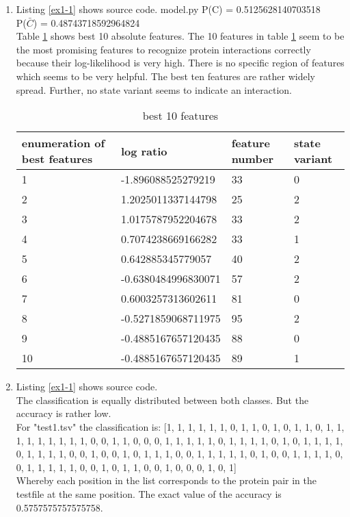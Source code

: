 \documentclass[10pt,a4paper]{article}
\begin{document}
\begin{enumerate}
\item Listing \ref{ex1-1} shows source code.
 {model.py}
P(C) = 0.5125628140703518\\
P($\bar{C}$) = 0.48743718592964824\\
Table \ref{tab1} shows best 10 absolute features.
The 10 features in table \ref{tab1} seem to be the most promising features to recognize protein interactions correctly because their log-likelihood is very high. There is no specific region of features which seems to be very helpful. The best ten features are rather widely spread. Further, no state variant seems to indicate an interaction.
\begin{table}[b]
\label{tab1}
\begin{tabular}{llll}
enumeration of best features & log ratio & feature number & state variant\\
\hline
1 & -1.896088525279219 & 33 & 0\\
2 & 1.2025011337144798 & 25 & 2\\
3 & 1.0175787952204678 & 33 & 2\\
4 & 0.7074238669166282 & 33 & 1\\
5 & 0.642885345779057 & 40 & 2\\
6 & -0.6380484996830071 & 57 & 2\\
7 & 0.6003257313602611 & 81 & 0\\
8 & -0.5271859068711975 & 95 & 2\\
9 & -0.4885167657120435 & 88 & 0\\
10 & -0.4885167657120435 & 89 & 1\\
\end{tabular}
\caption{best 10 features}
\end{table}

\item Listing \ref{ex1-1} shows source code.\\
The classification is equally distributed between both classes. But the accuracy is rather low.\\
For "test1.tsv" the classification is: [1, 1, 1, 1, 1, 1, 0, 1, 1, 0, 1, 0, 1, 1, 0, 1, 1, 1, 1, 1, 1, 1, 1, 1, 0, 0, 1, 1, 0, 0, 0, 1, 1, 1, 1, 1, 0, 1, 1, 1, 1, 0, 1, 0, 1, 1, 1, 1, 0, 1, 1, 1, 1, 0, 0, 1, 0, 0, 1, 0, 1, 1, 1, 0, 0, 1, 1, 1, 1, 1, 0, 1, 0, 0, 1, 1, 1, 1, 0, 0, 1, 1, 1, 1, 1, 0, 0, 1, 0, 1, 1, 0, 0, 1, 0, 0, 0, 1, 0, 1]\\
Whereby each position in the list corresponds to the protein pair in the testfile at the same position. The exact value of the accuracy is 0.5757575757575758.


\end{enumerate}
\end{document}

